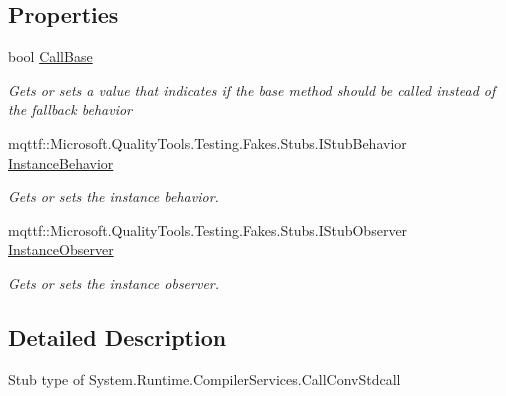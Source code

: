 \subsection*{Properties}
\begin{DoxyCompactItemize}
\item 
bool \hyperlink{class_system_1_1_runtime_1_1_compiler_services_1_1_fakes_1_1_stub_call_conv_stdcall_a01932b69ae3cc7a01592bc65d23bdfe8}{Call\-Base}
\begin{DoxyCompactList}\small\item\em Gets or sets a value that indicates if the base method should be called instead of the fallback behavior\end{DoxyCompactList}\item 
mqttf\-::\-Microsoft.\-Quality\-Tools.\-Testing.\-Fakes.\-Stubs.\-I\-Stub\-Behavior \hyperlink{class_system_1_1_runtime_1_1_compiler_services_1_1_fakes_1_1_stub_call_conv_stdcall_a7f18e18bbdd66f56c6cda01beb3a7dd6}{Instance\-Behavior}
\begin{DoxyCompactList}\small\item\em Gets or sets the instance behavior.\end{DoxyCompactList}\item 
mqttf\-::\-Microsoft.\-Quality\-Tools.\-Testing.\-Fakes.\-Stubs.\-I\-Stub\-Observer \hyperlink{class_system_1_1_runtime_1_1_compiler_services_1_1_fakes_1_1_stub_call_conv_stdcall_a0a7b11162d31c3da4751189d1c5eddc5}{Instance\-Observer}
\begin{DoxyCompactList}\small\item\em Gets or sets the instance observer.\end{DoxyCompactList}\end{DoxyCompactItemize}


\subsection{Detailed Description}
Stub type of System.\-Runtime.\-Compiler\-Services.\-Call\-Conv\-Stdcall



